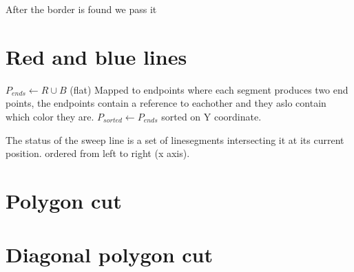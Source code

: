 \documentclass{article}
\begin{document}
After the border is found we pass it 
\section{Red and blue lines}
\begin{algorithmic}[1]
	\State
	$P_{ends} \gets R \cup B$ (flat) Mapped to endpoints where each segment
	produces two end points, the endpoints contain a reference to eachother
	and they aslo contain which color they are.
	\State
	$P_{sorted} \gets P_{ends}$ sorted on Y coordinate.
	\EndFor
\end{algorithmic}

The status of the sweep line is a set of linesegments intersecting it at
its current position. ordered from left to right (x axis).

\section{Polygon cut}
\section{Diagonal polygon cut}
\end{document}
